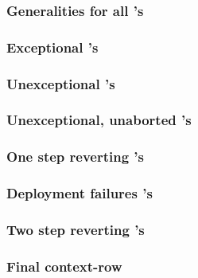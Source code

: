 \subsubsection{Generalities for all 's     \lispDone{}}  \label{hub: instruction handling: create: generalities: all}                         
\subsubsection{Exceptional 's              \lispDone{}}  \label{hub: instruction handling: create: generalities: exceptional}                 
\subsubsection{Unexceptional 's            \lispDone{}}  \label{hub: instruction handling: create: generalities: unexceptional}               
\subsubsection{Unexceptional, unaborted 's \lispDone{}}  \label{hub: instruction handling: create: generalities: unexceptional, unaborted}    
\subsubsection{One step reverting 's       \lispDone{}}  \label{hub: instruction handling: create: generalities: simply reverting}            
\subsubsection{Deployment failures 's      \lispDone{}}  \label{hub: instruction handling: create: generalities: deployment failures}         
\subsubsection{Two step reverting 's       \lispDone{}}  \label{hub: instruction handling: create: generalities: reverted deployment failure} 
\subsubsection{Final context-row                        \lispDone{}}  \label{hub: instruction handling: create: generalities: final context row}           
